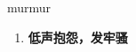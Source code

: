 
\begin{frame}
{\huge murmur}
\begin{center}
\begin{enumerate}\Large
  \item \textbf{低声抱怨，发牢骚}
\end{enumerate}
\end{center}
\end{frame}

